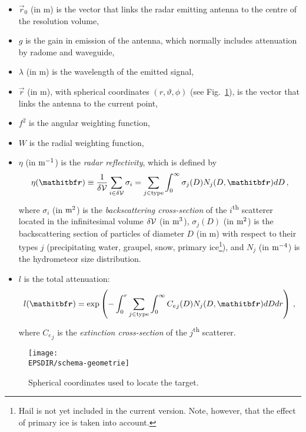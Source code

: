 \begin{itemize}
\item $\vec r_0$ (in m) is the vector that links the radar emitting antenna to the centre of the resolution volume, 
\item $g$ is the gain in emission of the antenna, which normally includes attenuation by radome and waveguide, 
\item $\lambda$ (in m) is the wavelength of the emitted signal, 
\item $\vec r$ (in m), with spherical coordinates $(r,\vartheta,\phi)$ (see Fig.~\ref{coord-spher}), is the vector that links the antenna to the current point, 
\item $f^2$ is the angular weighting function,
\item $W$ is the radial weighting function, 
\item $\eta$ (in $\rm m^{-1}$) is the \emph{radar reflectivity}, which is defined by
\begin{equation}
\eta(\vec r)\equiv\frac1{\delta\cal V}\sum_{i\in\delta\cal V}\sigma_i=\sum_{j\in\rm type}\int_0^\infty\sigma_j(D)N_j(D,\vec r)d D\,,\label{eta}
\end{equation}
where $\sigma_i$ (in $\rm m^2$) is the \emph{backscattering cross-section} of the $i$\textsuperscript{th} scatterer located in the infinitesimal volume $\delta\cal V$ (in $\rm m^3$), $\sigma_j(D)$ (in $\rm m^2$) is the backscattering section of particles of diameter $D$ (in m) with respect to their types $j$ (precipitating water, graupel, snow, primary ice\footnote{Hail is not yet included in the current version. Note, however, that the effect of primary ice is taken into account.}), and $N_j$ (in $\rm m^{-4}$) is the hydrometeor size distribution. %
\item $l$ is the total attenuation:
\begin{equation}
l({\vec r})=\exp\left(-\int_0^r\sum_{j\in\rm type}\int_0^\infty {C_e}_j(D)N_j(D,{\vec r})d Dd r\right)\,,\label{l}
\end{equation}
where ${C_e}_j$ is the \emph{extinction cross-section} of the $j$\textsuperscript{th} scatterer.
\end{itemize}

 \begin{figure}
 \centering
 \texttt{[image: \\EPSDIR/schema-geometrie]}
 \caption{Spherical coordinates used to locate the target.}\label{coord-spher}
 \end{figure}

